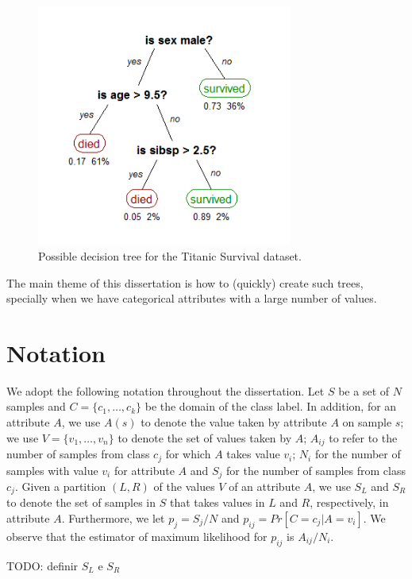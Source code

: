 \begin{figure}[h]
\centering
\includegraphics[width=0.75\textwidth]{titanic-tree}
\caption{Possible decision tree for the Titanic Survival dataset.}
\label{fig:titanic-tree}
\end{figure}

The main theme of this dissertation is how to (quickly) create such trees, specially when we have categorical attributes with a large number of values.

\section{Notation}
\label{sec:notation}
We adopt the following notation throughout the dissertation.
Let $S$ be a set of $N$ samples and 
 $C=\{c_1,\ldots,c_k\}$ be the domain of the class label. 
In addition, for an attribute  $A$, we use $A(s)$ to denote the value taken by attribute
$A$ on sample $s$; we use 
  $V=\{ v_1,\ldots,v_n \}$ to denote the set of values
taken by $A$;
$A_{ij}$ to refer to the  number of samples
from class $c_j$ for which  $A$ takes value $v_i$; 
 $N_i$ for the number of samples with value $v_i$ for attribute $A$
and $S_j$ for the number of samples from class $c_j$.
Given a partition $(L, R)$ of the values $V$ of an attribute $A$, we use $S_L$ and $S_R$
to denote the set of samples in $S$ that takes values in $L$ and $R$, respectively, in attribute $A$.
Furthermore, we let $p_j = S_j /N$ and $p_{ij}= Pr[C=c_j | A = v_i]$.
We observe that the estimator of maximum likelihood for $p_{ij} $ is
$A_{ij} / N_i$.  

TODO: definir $S_L$ e $S_R$


